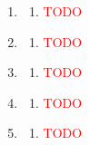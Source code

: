 \begin{enumerate}[label=(\roman*)]

    \item 

        \begin{multicols}{2}
        \begin{enumerate}[label=(\alph*)]
            \setlength\itemsep{0em}
            \item \textcolor{red}{TODO} 
        \end{enumerate}
        \end{multicols}

    \item 

        \begin{multicols}{2}
        \begin{enumerate}[label=(\alph*)]
            \setlength\itemsep{0em}
            \item \textcolor{red}{TODO} 
        \end{enumerate}
        \end{multicols}

    \item 

        \begin{multicols}{2}
        \begin{enumerate}[label=(\alph*)]
            \setlength\itemsep{0em}
            \item \textcolor{red}{TODO} 
        \end{enumerate}
        \end{multicols}

    \item 

        \begin{multicols}{2}
        \begin{enumerate}[label=(\alph*)]
            \setlength\itemsep{0em}
            \item \textcolor{red}{TODO} 
        \end{enumerate}
        \end{multicols}

    \item 

        \begin{multicols}{2}
        \begin{enumerate}[label=(\alph*)]
            \setlength\itemsep{0em}
            \item \textcolor{red}{TODO} 
        \end{enumerate}
        \end{multicols}

\end{enumerate}

